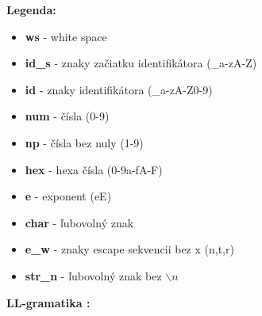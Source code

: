 \documentclass[12pt]{article}
\begin{document}
\textbf{Legenda:}
\small
\begin{multicols}{2}
\begin{itemize}
\item \textbf{ws} - white space
\item \textbf{id\_s} - znaky začiatku identifikátora (\_a-zA-Z)
\item \textbf{id} - znaky identifikátora (\_a-zA-Z0-9)
\item \textbf{num} - čísla (0-9)
\item \textbf{np} - čísla bez nuly (1-9)
\item \textbf{hex} - hexa čísla (0-9a-fA-F)
\item \textbf{e} - exponent (eE)
\item \textbf{char} - ľubovolný znak
\item \textbf{e\_w} - znaky escape sekvencii bez x (n,t,r)
\item \textbf{str\_n} - ľubovolný znak bez $\backslash n$
\end{itemize}
\end{multicols}



\newpage

 \Large \textbf{LL-gramatika :} \\ \normalsize
\noindent\makebox[\linewidth]{\rule{\textwidth}{0.4pt}}
\end{document}
